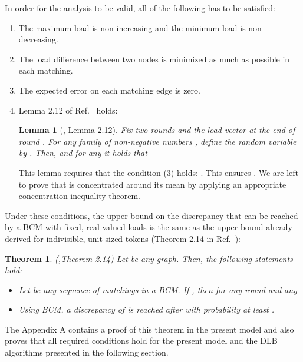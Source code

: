 \documentclass[12pt,psfig,a4]{article}
\newtheorem{mytheorem}{Theorem}
\newtheorem{mylemma}{Lemma}
\theoremstyle{plain}
\begin{document}
In order for the analysis to be valid, all of the following has to be satisfied:
\begin{enumerate}
	\item The maximum load is non-increasing and the minimum load is non-decreasing.
	\item The load difference between two nodes is minimized as much as possible in each matching. 
	\item The expected error on each matching edge  is zero. 
	\item Lemma 2.12 of Ref.~\cite{sauerwald2012tight} holds:
	\begin{mylemma}[\cite{sauerwald2012tight}, Lemma 2.12] 
	\label{lemma:first}
		Fix two rounds  and the load vector  at the end of round . For any family of non-negative numbers   , define the random variable  by . Then,  and for any  it holds that
		
	\end{mylemma}
	This lemma requires that the condition (3) holds: . This ensures . We are left to prove that  is concentrated around its mean by applying an appropriate concentration inequality theorem.
\end{enumerate}
Under these conditions, the upper bound on the discrepancy that can be reached by a BCM with fixed, real-valued loads is the same as the upper bound already derived for indivisible, unit-sized tokens (Theorem 2.14 in Ref.~\cite{sauerwald2012tight}):
\begin{mytheorem} (\cite{sauerwald2012tight},Theorem 2.14)
\label{theorem:result}
	Let  be any graph. Then, the following statements hold:
	\begin{itemize}
		\item Let  be any sequence of matchings in a BCM. If , then for any round  and any 
		
		\item Using BCM, a discrepancy of  is reached after  with probability at least .
	\end{itemize}
\end{mytheorem}
The Appendix A contains a proof of this theorem in the present model and also proves that all required conditions hold for the present model and the DLB algorithms presented in the following section.
\end{document}
